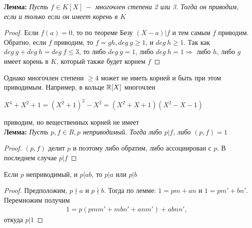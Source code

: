 \begin{normalsize}
    \textbf{Лемма:}
    \textit{Пусть $f \in K[X] \ - $ многочлен степени 2 или 3. Тогда он приводим, если и только если он имеет 
    корень в $K$}
    \begin{proof}
        Если $f(a) = 0$, то по теореме Безу $(X - a)|f$ и тем самым $f$ приводим.
        Обратно, если $f$ приводим, то $f = gh, deg \ g \geqslant 1$, и $deg \ h \geqslant 1$.
        Так как $deg \ g + deg \ h = deg \ f \leqslant 3$, то либо $deg \ g  = 1$, либо $deg \ h  = 1
        \Longrightarrow$ либо $h$, либо $g$ имеет корень в $K$, который также будет корнем $f$
    \end{proof}
    \qquad Однако многочлен степени $\geqslant 4$ может не иметь корней и быть при этом приводимым. Например, в кольце $\mathbb{R}[X]$ многочлен
    \begin{center}
        $X^4 + X^2 + 1 = (X^2 + 1)^2 - X^2 = (X^2 + X + 1)(X^2 - X - 1)$
    \end{center}
    приводим, но вещественных корней не имеет \\
    \textbf{Лемма:}
    \textit{Пусть $p, f \in R, p$ неприводимый. Тогда либо $p | f$, либо $(p, f) = 1$}
    \begin{proof}
        $(p, f)$ делит $p$ и поэтому либо обратим, либо ассоциирован с $p$. В последнем случае
        $p | f$
    \end{proof}
    \begin{theorem-non}
        Если $p$ неприводимый, и $p | ab$, то $p | a$ или $p | b$
    \end{theorem-non}
    \begin{proof}
        Предположим, $p \nmid a$ и $p \nmid b$. Тогда по лемме: $1 = pm + an$ и $1 = pm' + bn'$.
        Перемножим получим 
        \begin{gather*}
            1 = p(pmm' + mbn' + anm') + abnn',
        \end{gather*}
        откуда $p | 1$
    \end{proof}
\end{normalsize}